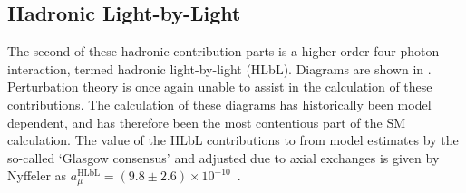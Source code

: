 \subsection*{Hadronic Light-by-Light}
\label{subsec:HLbL}

The second of these hadronic contribution parts is a higher-order four-photon interaction, termed hadronic light-by-light (HLbL). Diagrams are shown in . Perturbation theory is once again unable to assist in the calculation of these contributions. The calculation of these diagrams has historically been model dependent, and has therefore been the most contentious part of the SM calculation. The value of the HLbL contributions to \amu from model estimates by the so-called `Glasgow consensus' and adjusted due to axial exchanges is given by Nyffeler as $a_{\mu}^{\text{HLbL}} = (9.8 \pm 2.6) \times 10^{-10}$~\cite{Prades:2009tw,Nyffeler:2016gnb}.


